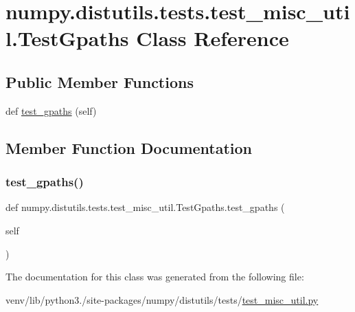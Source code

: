 \hypertarget{classnumpy_1_1distutils_1_1tests_1_1test__misc__util_1_1TestGpaths}{}\section{numpy.\+distutils.\+tests.\+test\+\_\+misc\+\_\+util.\+Test\+Gpaths Class Reference}
\label{classnumpy_1_1distutils_1_1tests_1_1test__misc__util_1_1TestGpaths}
\subsection*{Public Member Functions}
\begin{DoxyCompactItemize}
\item 
def \hyperlink{classnumpy_1_1distutils_1_1tests_1_1test__misc__util_1_1TestGpaths_a41b686a1a7942eb8bb8a7c0ccacf12dd}{test\+\_\+gpaths} (self)
\end{DoxyCompactItemize}


\subsection{Member Function Documentation}
\mbox{\label{classnumpy_1_1distutils_1_1tests_1_1test__misc__util_1_1TestGpaths_a41b686a1a7942eb8bb8a7c0ccacf12dd}} 
\subsubsection{\texorpdfstring{test\+\_\+gpaths()}{test\_gpaths()}}
{\footnotesize\ttfamily def numpy.\+distutils.\+tests.\+test\+\_\+misc\+\_\+util.\+Test\+Gpaths.\+test\+\_\+gpaths (\begin{DoxyParamCaption}\item[{}]{self }\end{DoxyParamCaption})}



The documentation for this class was generated from the following file\+:\begin{DoxyCompactItemize}
\item 
venv/lib/python3./site-\/packages/numpy/distutils/tests/\hyperlink{test__misc__util_8py}{test\+\_\+misc\+\_\+util.\+py}\end{DoxyCompactItemize}
